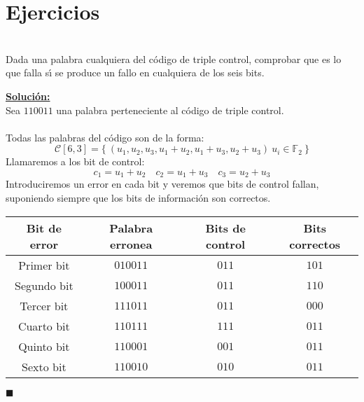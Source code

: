 %
%

\section{Ejercicios}

\begin{ejercicio}
\ \\
Dada una palabra cualquiera del c\'odigo de triple control, comprobar que es lo
que falla s\'{\i} se produce un fallo en cualquiera de los seis bits.
\end{ejercicio}
\textbf{\underline{Soluci\'on:}}\\
Sea $110011$ una palabra perteneciente al c\'odigo de triple control.\\ \\
%
Todas las palabras del c\'odigo son de la forma:
\begin{displaymath}
\mathcal{C}[6,3]=\{\ (u_1,u_2,u_3,u_1+u_2,u_1+u_3,u_2+u_3)\ u_i \in \mathbb{F}_2
\ \}
\end{displaymath}
Llamaremos a los bit de control:
\begin{displaymath}
c_1 = u_1+u_2\quad c_2=u_1+u_3\quad c_3=u_2+u_3
\end{displaymath}
Introduciremos un error en cada bit y veremos que bits de control fallan,
suponiendo siempre que los bits de informaci\'on son correctos.\\ 
\begin{center}
\begin{tabular}{|c|c|c|c|}
\hline
Bit de error & Palabra erronea & Bits de control & Bits correctos\\
\hline
Primer bit & $010011$ & $011$ & $101$ \\
\hline
Segundo bit & $100011$ & $011$ & $110$ \\
\hline
Tercer bit & $111011$ & $011$ & $000$ \\
\hline
Cuarto bit & $110111$ & $111$ & $011$ \\
\hline
Quinto bit & $110001$ & $001$ & $011$ \\
\hline
Sexto bit & $110010$ & $010$ & $011$ \\
\hline
\end{tabular}
\end{center}
\begin{flushright}
$\blacksquare$
\end{flushright}
